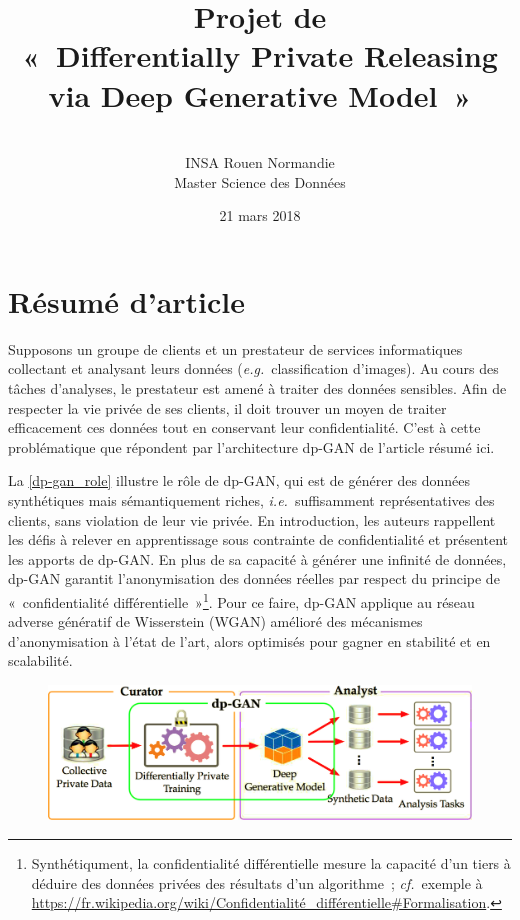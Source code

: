 \documentclass[a4paper,11pt,twoside]{article}
\title{\textbf{Projet de \DL}\\«~Differentially Private Releasing via Deep Generative Model~»}
\author{\textbf{\AH}\\INSA Rouen Normandie\\Master Science des Données}
\date{21 mars 2018}
\theoremstyle{definition}
\newcommand{\eg}{\textit{e.g.}}
\newcommand{\ie}{\textit{i.e.}}
\newcommand{\cf}{\textit{cf.}}
\begin{document}
\maketitle
\thispagestyle{empty}

\section{Résumé d'article}
\label{resume}

Supposons un groupe de clients et un prestateur de services informatiques collectant et analysant leurs données (\eg\ classification d'images). Au cours des tâches d'analyses, le prestateur est amené à traiter des données sensibles. Afin de respecter la vie privée de ses clients, il doit trouver un moyen de traiter efficacement ces données tout en conservant leur confidentialité. C'est à cette problématique que répondent \citet{dpgan} par l'architecture dp-GAN de l'article résumé ici.

La \autoref{dp-gan_role} illustre le rôle de dp-GAN, qui est de générer des données synthétiques mais sémantiquement riches, \ie\ suffisamment représentatives des clients, sans violation de leur vie privée.
En introduction, les auteurs rappellent les défis à relever en apprentissage sous contrainte de confidentialité et présentent les apports de dp-GAN. En plus de sa capacité à générer une infinité de données, dp-GAN garantit l'anonymisation des données réelles par respect du principe de « confidentialité différentielle »\footnote{Synthétiqument, la confidentialité différentielle mesure la capacité d'un tiers à déduire des données privées des résultats d'un algorithme ; \cf\ exemple à \url{https://fr.wikipedia.org/wiki/Confidentialité_différentielle#Formalisation}.}.
Pour ce faire, dp-GAN applique au réseau adverse génératif de Wisserstein (WGAN) amélioré des mécanismes d'anonymisation à l'état de l'art, alors optimisés pour gagner en stabilité et en scalabilité.

\begin{figure}
    \centering
    \includegraphics[width=12cm]{dp-gan_role.png}
    \label{dp-gan_role}
\end{figure}
\end{document}
